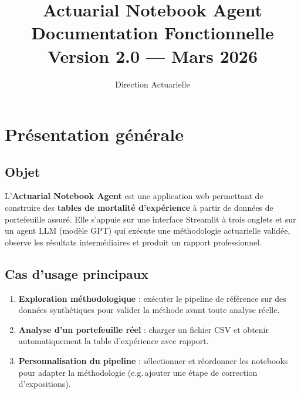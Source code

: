 \documentclass[11pt,a4paper]{article}
\title{%
  \textbf{Actuarial Notebook Agent}\\[0.5em]
  \large Documentation Fonctionnelle\\[0.3em]
  \normalsize Version 2.0 — Mars 2026
}
\author{Direction Actuarielle}
\date{}
\begin{document}
\maketitle
\tableofcontents
\newpage

\section{Présentation générale}

\subsection{Objet}
L'\textbf{Actuarial Notebook Agent} est une application web permettant de construire
des \textbf{tables de mortalité d'expérience} à partir de données de portefeuille assuré.
Elle s'appuie sur une interface Streamlit à trois onglets et sur un agent LLM (modèle GPT)
qui exécute une méthodologie actuarielle validée, observe les résultats intermédiaires et
produit un rapport professionnel.

\subsection{Cas d'usage principaux}
\begin{enumerate}[leftmargin=2cm]
  \item \textbf{Exploration méthodologique} : exécuter le pipeline de référence sur des
        données synthétiques pour valider la méthode avant toute analyse réelle.
  \item \textbf{Analyse d'un portefeuille réel} : charger un fichier CSV et obtenir
        automatiquement la table d'expérience avec rapport.
  \item \textbf{Personnalisation du pipeline} : sélectionner et réordonner les notebooks
        pour adapter la méthodologie (e.g.\,ajouter une étape de correction d'expositions).
\end{enumerate}
\end{document}
